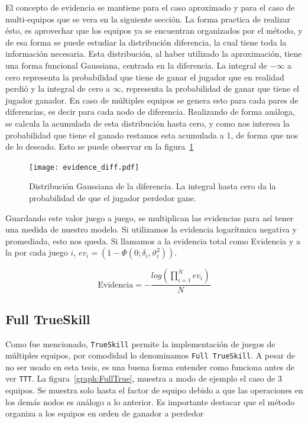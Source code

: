 \documentclass[11pt,twoside, spanish]{report} %
\begin{document}
El concepto de evidencia se mantiene para el caso aproximado y para el caso de multi-equipos que se vera en la siguiente secci\'on.
La forma practica de realizar \'esto, es aprovechar que los equipos ya se encuentran organizados por el m\'etodo, y de esa forma se puede estudiar la distribuci\'on diferencia, la cual tiene toda la informaci\'on necesaria.
Esta distribuci\'on, al haber utilizado la aproximaci\'on, tiene una forma funcional Gaussiana, centrada en la diferencia.
La integral de $-\infty$ a cero representa la probabilidad que tiene de ganar el jugador que en realidad perdi\'o y la integral de cero a  $\infty$, representa la probabilidad de ganar que tiene el jugador ganador.
En caso de m\'ultiples equipos se genera esto para cada pares de diferencias, es decir para cada nodo de diferencia.
Realizando de forma an\'aloga, se calcula la acumulada de esta distribuci\'on hasta cero, y como nos interesa la probabilidad que tiene el ganado restamos esta acumulada a 1, de forma que nos de lo deseado.
Esto se puede observar en la figura~\ref{fig:evidenciadiff}


\begin{figure}[H]
	\centering
	\texttt{[image: evidence\_diff.pdf]}
	\caption{Distribuci\'on Gaussiana de la diferencia. La integral hasta cero da la probabilidad de que el jugador perdedor gane.}
	\label{fig:evidenciadiff}
\end{figure}

Guardando este valor juego a juego, se multiplican las evidencias para as\'i tener una medida de nuestro modelo. Si utilizamos la evidencia logar\'itmica negativa y promediada, esto nos queda.
Si llamamos a la evidencia total como Evidencia y a la por cada juego $i$, $ev_i=(1-\Phi(0;\delta_i,\vartheta_i^2))$.

\begin{equation}
	\text{Evidencia} = -\frac{log(\prod_{i=1}^{N}ev_i)}{N}
\end{equation}



\subsection{Full TrueSkill}


Como fue mencionado, \texttt{TrueSkill} permite la implementaci\'on de juegos de m\'ultiples equipos, por comodidad lo denominamos \texttt{Full TrueSkill}.
A pesar de no ser usado en esta tesis, es una buena forma entender como funciona antes de ver \texttt{TTT}.
La figura~\ref{graph:FullTrue}, muestra a modo de ejemplo el caso de 3 equipos.
Se muestra solo hasta el factor de equipo debido a que las operaciones en los dem\'as nodos es an\'alogo a lo anterior.
Es importante destacar que el m\'etodo organiza a los equipos en orden de ganador a perdedor
\end{document}

